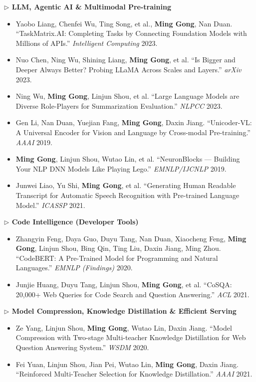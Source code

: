 \documentclass[10.5pt,letterpaper]{article}
\begin{document}
\noindent\textcolor{blue!60!black}{\textbf{$\triangleright$ LLM, Agentic AI \& Multimodal Pre-training}}
\begin{itemize}
  \item Yaobo Liang, Chenfei Wu, Ting Song, et al., \textbf{Ming Gong}, Nan Duan. ``TaskMatrix.AI: Completing Tasks by Connecting Foundation Models with Millions of APIs.'' \textit{Intelligent Computing} 2023.
  \item Nuo Chen, Ning Wu, Shining Liang, \textbf{Ming Gong}, et al. ``Is Bigger and Deeper Always Better? Probing LLaMA Across Scales and Layers.'' \textit{arXiv} 2023.
  \item Ning Wu, \textbf{Ming Gong}, Linjun Shou, et al. ``Large Language Models are Diverse Role-Players for Summarization Evaluation.'' \textit{NLPCC} 2023.
  \item Gen Li, Nan Duan, Yuejian Fang, \textbf{Ming Gong}, Daxin Jiang. ``Unicoder-VL: A Universal Encoder for Vision and Language by Cross-modal Pre-training.'' \textit{AAAI} 2019.
  \item \textbf{Ming Gong}, Linjun Shou, Wutao Lin, et al. ``NeuronBlocks --- Building Your NLP DNN Models Like Playing Lego.'' \textit{EMNLP/IJCNLP} 2019.
  \item Junwei Liao, Yu Shi, \textbf{Ming Gong}, et al. ``Generating Human Readable Transcript for Automatic Speech Recognition with Pre-trained Language Model.'' \textit{ICASSP} 2021.
\end{itemize}

\noindent\textcolor{blue!60!black}{\textbf{$\triangleright$ Code Intelligence (Developer Tools)}}
\begin{itemize}
  \item Zhangyin Feng, Daya Guo, Duyu Tang, Nan Duan, Xiaocheng Feng, \textbf{Ming Gong}, Linjun Shou, Bing Qin, Ting Liu, Daxin Jiang, Ming Zhou. ``CodeBERT: A Pre-Trained Model for Programming and Natural Languages.'' \textit{EMNLP (Findings)} 2020.
  \item Junjie Huang, Duyu Tang, Linjun Shou, \textbf{Ming Gong}, et al. ``CoSQA: 20,000+ Web Queries for Code Search and Question Answering.'' \textit{ACL} 2021.
\end{itemize}

\noindent\textcolor{blue!60!black}{\textbf{$\triangleright$ Model Compression, Knowledge Distillation \& Efficient Serving}}
\begin{itemize}
  \item Ze Yang, Linjun Shou, \textbf{Ming Gong}, Wutao Lin, Daxin Jiang. ``Model Compression with Two-stage Multi-teacher Knowledge Distillation for Web Question Answering System.'' \textit{WSDM} 2020.
  \item Fei Yuan, Linjun Shou, Jian Pei, Wutao Lin, \textbf{Ming Gong}, Daxin Jiang. ``Reinforced Multi-Teacher Selection for Knowledge Distillation.'' \textit{AAAI} 2021.
\end{itemize}
\end{document}
